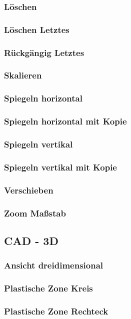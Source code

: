 \documentclass[a4paper]{book}
\begin{document}
			\subsubsection{Löschen}
			\subsubsection{Löschen Letztes}
			\subsubsection{Rückgängig Letztes}
			\subsubsection{Skalieren}
			\subsubsection{Spiegeln horizontal}
			\subsubsection{Spiegeln horizontal mit Kopie}
			\subsubsection{Spiegeln vertikal}
			\subsubsection{Spiegeln vertikal mit Kopie}
			\subsubsection{Verschieben}
			\subsubsection{Zoom Maßstab}
		\subsection{CAD - 3D}
			\subsubsection{Ansicht dreidimensional}
			\subsubsection{Plastische Zone Kreis}
			\subsubsection{Plastische Zone Rechteck}
\end{document}
